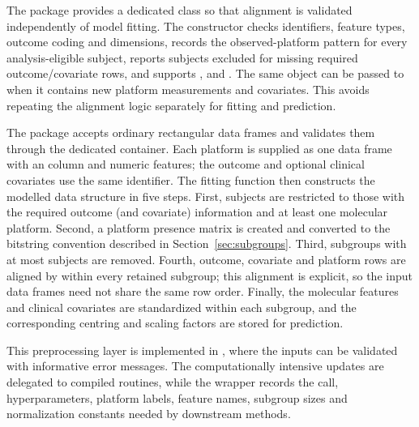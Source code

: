 \documentclass[article]{jss}
\begin{document}
The package provides a dedicated  class so that alignment is
validated independently of model fitting.  The constructor 
checks identifiers, feature types, outcome coding and dimensions, records the
observed-platform pattern for every analysis-eligible subject, reports subjects
excluded for missing required outcome/covariate rows, and supports ,
 and .  The same object can be
passed to  when it contains new platform measurements and
covariates.  This avoids repeating the alignment logic separately for fitting
and prediction.

The package accepts ordinary rectangular  data frames and validates
them through the dedicated  container.  Each
platform is supplied as one data frame with an  column and numeric
features; the outcome and optional clinical covariates use the same identifier.
The fitting function then constructs the modelled data structure in five steps.
First, subjects are restricted to those with the required outcome (and
covariate) information and at least one molecular platform.  Second, a platform
presence matrix is created and converted to the bitstring convention described
in Section~\ref{sec:subgroups}.  Third, subgroups with at most 
subjects are removed.  Fourth, outcome, covariate and platform rows are aligned
by  within every retained subgroup; this alignment is explicit, so the
input data frames need not share the same row order.  Finally, the molecular
features and clinical covariates are standardized within each subgroup, and the
corresponding centring and scaling factors are stored for prediction.

This preprocessing layer is implemented in , where the inputs can be
validated with informative error messages.  The computationally intensive
updates are delegated to compiled  routines, while the
 wrapper records the call, hyperparameters, platform labels,
feature names, subgroup sizes and normalization constants needed by downstream
methods.
\end{document}
